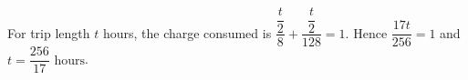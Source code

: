For trip length $t$ hours, the charge consumed is $\dfrac{\dfrac{t}{2}}{8}+\dfrac{\dfrac{t}{2}}{128}=1$. Hence $\dfrac{17t}{256}=1$ and $\boxed{t=\dfrac{256}{17}\text{ hours}}$.
